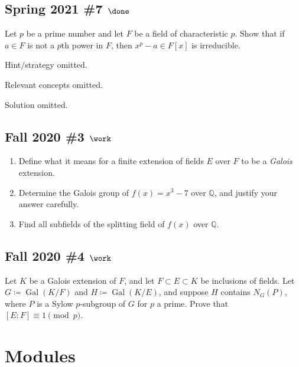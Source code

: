 \hypertarget{spring-2021-7-done}{%
\subsection{\texorpdfstring{Spring 2021 \#7
\(\done\)}{Spring 2021 \#7 \textbackslash done}}\label{spring-2021-7-done}}

Let \(p\) be a prime number and let \(F\) be a field of characteristic
\(p\). Show that if \(a\in F\) is not a \(p\)th power in \(F\), then
\(x^p-a \in F[x]\) is irreducible.

Hint/strategy omitted.

Relevant concepts omitted.

Solution omitted.

\hypertarget{fall-2020-3-work}{%
\subsection{\texorpdfstring{Fall 2020 \#3
\(\work\)}{Fall 2020 \#3 \textbackslash work}}\label{fall-2020-3-work}}

\begin{enumerate}
\def\labelenumi{\alph{enumi}.}
\item
  Define what it means for a finite extension of fields \(E\) over \(F\)
  to be a \emph{Galois} extension.
\item
  Determine the Galois group of \(f(x) = x^3 - 7\) over
  \({\mathbb{Q}}\), and justify your answer carefully.
\item
  Find all subfields of the splitting field of \(f(x)\) over
  \({\mathbb{Q}}\).
\end{enumerate}

\hypertarget{fall-2020-4-work}{%
\subsection{\texorpdfstring{Fall 2020 \#4
\(\work\)}{Fall 2020 \#4 \textbackslash work}}\label{fall-2020-4-work}}

Let \(K\) be a Galois extension of \(F\), and let
\(F \subset E \subset K\) be inclusions of fields. Let
\(G \coloneqq\operatorname{Gal}(K/F)\) and
\(H \coloneqq\operatorname{Gal}(K/E)\), and suppose \(H\) contains
\(N_G(P)\), where \(P\) is a Sylow \(p\)-subgroup of \(G\) for \(p\) a
prime. Prove that \([E: F] \equiv 1 \pmod p\).

\hypertarget{modules}{%
\section{Modules}\label{modules}}

